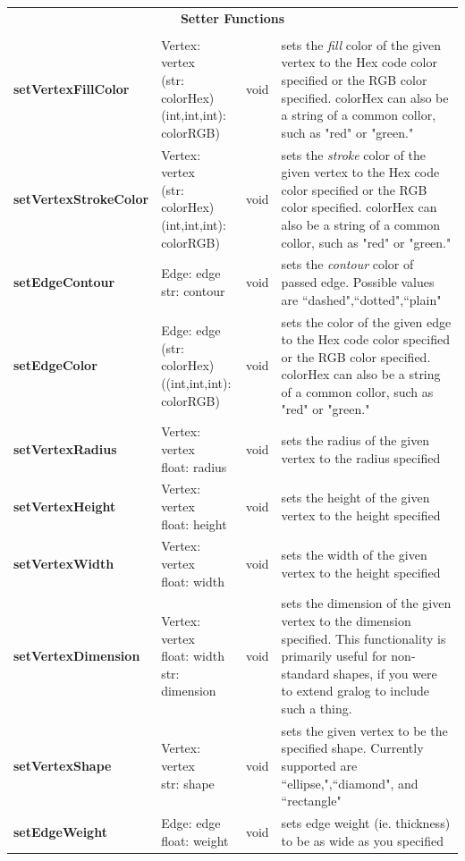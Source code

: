\documentclass{article}
\newlength\q
\newlength\smallCol
\newlength\argsLen
\begin{document}
\begin{longtable}{m{\smallCol}m{\argsLen}m{\smallCol}m{\q}}
\\\multicolumn{4}{c}{\textbf{Setter Functions}}\\\\\hline
\textbf{setVertexFillColor} & \makecell{Vertex: vertex\\(str: colorHex)\\(int,int,int): colorRGB)} & void & sets the \textit{fill} color of the given vertex to the Hex code color specified or the RGB color specified. colorHex can also be a string of a common collor, such as "red" or "green."  \\ \hline
\textbf{setVertexStrokeColor} & \makecell{Vertex: vertex\\(str: colorHex)\\(int,int,int): colorRGB)} & void & sets the \textit{stroke} color of the given vertex to the Hex code color specified or the RGB color specified. colorHex can also be a string of a common collor, such as "red" or "green."  \\ \hline
\textbf{setEdgeContour} & \makecell{Edge: edge\\str: contour} & void & sets the \textit{contour} color of passed edge. Possible values are ``dashed",``dotted",``plain" \\ \hline
\textbf{setEdgeColor} & \makecell{Edge: edge\\(str: colorHex)\\((int,int,int): colorRGB)} & void & sets the color of the given edge to the Hex code color specified or the RGB color specified. colorHex can also be a string of a common collor, such as "red" or "green."  \\ \hline
\textbf{setVertexRadius} & \makecell{Vertex: vertex\\float: radius} & void & sets the radius of the given vertex to the radius specified  \\ \hline
\textbf{setVertexHeight} & \makecell{Vertex: vertex\\float: height} & void & sets the height of the given vertex to the height specified  \\ \hline
\textbf{setVertexWidth} & \makecell{Vertex: vertex\\float: width} & void & sets the width of the given vertex to the height specified  \\ \hline
\textbf{setVertexDimension} & \makecell{Vertex: vertex\\float: width\\str: dimension} & void & sets the dimension of the given vertex to the dimension specified. This functionality is primarily useful for non-standard shapes, if you were to extend gralog to include such a thing. \\ \hline
\textbf{setVertexShape} & \makecell{Vertex: vertex\\str: shape} & void & sets the given vertex to be the specified shape. Currently supported are ``ellipse,",``diamond", and ``rectangle"  \\ \hline
\textbf{setEdgeWeight} & \makecell{Edge: edge\\float: weight} & void & sets edge weight (ie. thickness) to be as wide as you specified  \\ \hline
\end{longtable}
\end{document}

